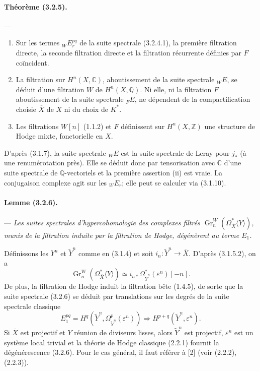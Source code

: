 \documentclass[10pt]{article}
\newcommand{\C}{\mathbb C}
\newcommand{\Q}{\mathbb Q}
\newcommand{\Z}{\mathbb Z}
\newcommand{\Gr}{\operatorname{Gr}}
\begin{document}
\paragraph{Théorème (3.2.5).} --- {\itshape
\begin{enumerate}[label=(\roman*),font=\itshape]
\item Sur les termes ${}_WE_r^{pq}$ de la suite spectrale (3.2.4.1), la première filtration directe, la seconde filtration directe et la filtration récurrente définies par $F$ coïncident.
\item La filtration sur $H^n(X,\C)$, aboutissement de la suite spectrale ${}_WE$, se déduit d'une filtration $W$ de $H^n(X,\Q)$. Ni elle, ni la filtration $F$ aboutissement de la suite spectrale ${}_FE$, ne dépendent de la compactification choisie $\overline X$ de $X$ ni du choix de $K^*$.
\item Les filtrations $W[n]$ (1.1.2) et $F$ définissent sur $H^n(X,\Z)$ une structure de Hodge mixte, fonctorielle en $X$.
\end{enumerate}}

D'après (3.1.7), la suite spectrale ${}_WE$ est la suite spectrale de Leray pour $j_*$ (à une renumérotation près). Elle se déduit donc par tensorisation avec $\C$ d'une suite spectrale de $\Q$-vectoriels et la première assertion (ii) est vraie. La conjugaison complexe agit sur les ${}_WE_r$; elle peut se calculer via (3.1.10).

\paragraph{Lemme (3.2.6).} --- {\itshape Les suites spectrales d'hypercohomologie des complexes filtrés $\Gr_n^W(\Omega_{\overline X}^{*}\langle Y\rangle)$, munis de la filtration induite par la filtration de Hodge, dégénèrent au terme $E_1$.}

Définissons les $Y^n$ et $\widetilde Y^n$ comme en (3.1.4) et soit $i_n:\widetilde Y^n\to\overline X$. D'après (3.1.5.2), on a
\[
\Gr_n^W(\Omega_{\overline X}^{*}\langle Y\rangle)
\simeq i_{n*}\Omega_{\widetilde Y^n}^{*}(\varepsilon^n)[-n].
\]
De plus, la filtration de Hodge induit la filtration bête (1.4.5), de sorte que la suite spectrale (3.2.6) se déduit par translations sur les degrés de la suite spectrale classique
\[
E_1^{pq}=H^q(\widetilde Y^n,\Omega_{\widetilde Y^n}^p(\varepsilon^n))
\Rightarrow H^{p+q}(\widetilde Y^n,\varepsilon^n).
\]
Si $\overline X$ est projectif et $Y$ réunion de diviseurs lisses, alors $\widetilde Y^n$ est projectif, $\varepsilon^n$ est un système local trivial et la théorie de Hodge classique (2.2.1) fournit la dégénérescence (3.2.6). Pour le cas général, il faut référer à [2] (voir (2.2.2), (2.2.3)).
\end{document}
